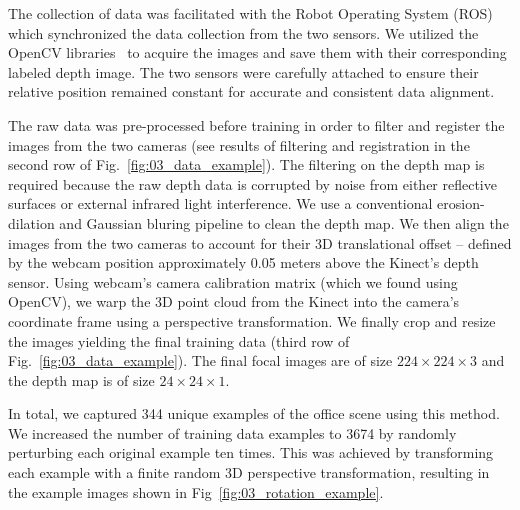 \documentclass[letterpaper, 10 pt, conference]{ieeeconf}  %
\begin{document}
The collection of data was facilitated with the Robot Operating System (ROS)~\cite{Quiqley2009ROS} which synchronized the data collection from the two sensors. We utilized the OpenCV libraries~\cite{bradski2008learning} to acquire the images and save them with their corresponding labeled depth image. The two sensors were carefully attached to ensure their relative position remained constant for accurate and consistent data alignment. 

The raw data was pre-processed before training in order to filter and register the images from the two cameras (see results of filtering and registration in the second row of Fig.~\ref{fig:03_data_example}). The filtering on the depth map is required because the raw depth data is corrupted by noise from either reflective surfaces or external infrared light interference. We use a conventional erosion-dilation and Gaussian bluring pipeline to clean the depth map. We then align the images from the two cameras to account for their 3D translational offset -- defined by the webcam position approximately 0.05 meters above the Kinect's depth sensor. Using webcam's camera calibration matrix (which we found using OpenCV), we warp the 3D point cloud from the Kinect into the camera's coordinate frame using a perspective transformation. We finally crop and resize the images yielding the final training data (third row of Fig.~\ref{fig:03_data_example}). The final focal images are of size $224 \times 224 \times 3$ and the depth map is of size $24 \times 24 \times 1$. 

In total, we captured 344 unique examples of the office scene using this method. We increased the number of training data examples to 3674 by randomly perturbing each original example ten times. This was achieved by transforming each example with a finite random 3D perspective transformation, resulting in the example images shown in Fig~\ref{fig:03_rotation_example}. 
\end{document}
